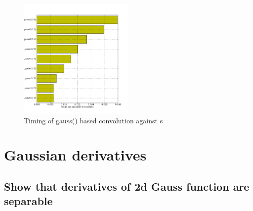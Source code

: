 \documentclass[abstract=true]{scrartcl}
\begin{document}
            \begin{figure}
              \centering
              \includegraphics[width=0.5\textwidth]{../images/4_time_gauss1}
              \caption{Timing of gauss() based convolution against s}
              \label{timing2}
            \end{figure}


\section{Gaussian derivatives}

    \subsection{Show that derivatives of 2d Gauss function are separable}
    
\end{document}
